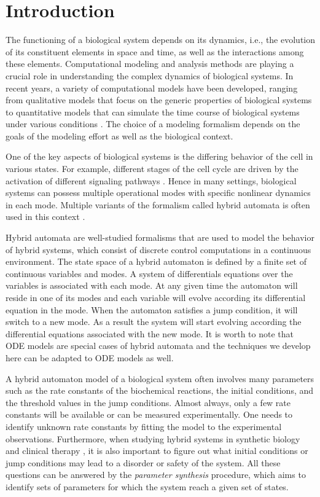 \section{Introduction}

The functioning of a biological system depends on its dynamics, i.e., the evolution of its constituent elements in space and time, as well as the interactions among these elements. Computational modeling and analysis methods are playing a crucial role in understanding the complex dynamics of biological systems. In recent years, a variety of computational models have been developed, ranging from qualitative models that focus on the generic properties of biological systems \citep{helikar08,gong11} to quantitative models that can simulate the time course of biological systems under various conditions \citep{wholecell,liu11plos}. The choice of a modeling formalism depends on the goals of the modeling effort as well as the biological context.

One of the key aspects of biological systems is the differing behavior of the cell in various states. For example, different stages of the cell cycle are driven by the activation of different signaling pathways \citep{thecell}. Hence in many settings, biological systems can possess multiple operational modes with specific nonlinear dynamics in each mode. Multiple variants of the formalism called hybrid automata \citep{henzinger96} is often used in this context \citep{tomlin04,ye08,aihara10,antoniotti03,lincoln04,baldazzi11}.

Hybrid automata are well-studied formalisms that are used to model the behavior of hybrid systems, which consist of discrete control computations in a continuous environment. The state space of a hybrid automaton is defined by a finite set of continuous variables and modes. A system of differentials equations over the variables is associated with each mode. At any given time the automaton will reside in one of its modes and each variable will evolve according its differential equation in the mode. When the automaton satisfies a jump condition, it will switch to a new mode. As a result the system will start evolving according the differential equations associated with the new mode. It is worth to note that ODE models are special cases of hybrid automata and the techniques we develop here can be adapted to ODE models as well.

A hybrid automaton model of a biological system often involves many parameters such as the rate constants of the biochemical reactions, the initial conditions, and the threshold values in the jump conditions. Almost always, only a few rate constants will be available or can be measured experimentally. One needs to identify unknown rate constants by fitting the model to the experimental observations. Furthermore, when studying hybrid systems in synthetic biology and clinical therapy \citep{tanaka10}, it is also important to figure out what initial conditions or jump conditions may lead to a disorder or safety of the system. All these questions can be answered by the \textit{parameter synthesis} procedure, which aims to identify sets of parameters for which the system reach a given set of states.

